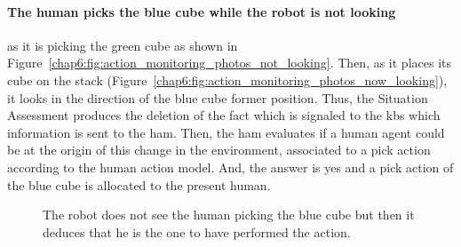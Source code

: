\documentclass[a4paper,11pt,twoside]{StyleThese}
\begin{document}
\paragraph{The human picks the blue cube while the robot is not looking} as it is picking the green cube as shown in Figure~\ref{chap6:fig:action_monitoring_photos_not_looking}. Then, as it places its cube on the stack (Figure~\ref{chap6:fig:action_monitoring_photos_now_looking}), it looks in the direction of the blue cube former position. Thus, the Situation Assessment produces the deletion of the fact  which is signaled to the \acrshort{kb}s which information is sent to the \acrshort{ham}. Then, the \acrshort{ham} evaluates if a human agent could be at the origin of this change in the environment, associated to a pick action according to the human action model. And, the answer is yes and a pick action of the blue cube is allocated to the present human.
\thispagestyle{example}
\begin{figure}[!hbtp]
	\hfill
	\hfill
	\caption{The robot does not see the human picking the blue cube but then it deduces that he is the one to have performed the action.}
	\label{chap6:fig:action_monitoring_photos_missing}
\end{figure}
	
\end{document}
